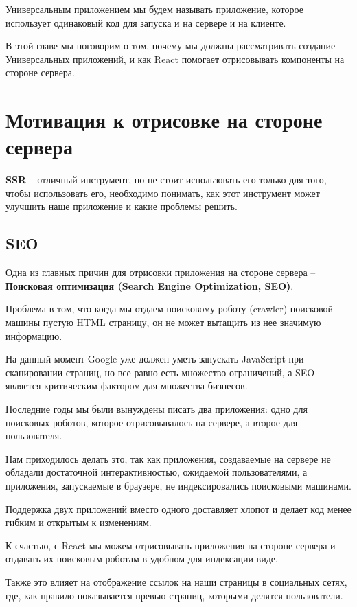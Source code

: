 Универсальным приложением мы будем называть приложение, которое использует одинаковый код для запуска и на сервере и на клиенте.

В этой главе мы поговорим о том, почему мы должны рассматривать создание Универсальных приложений, и как React помогает отрисовывать компоненты на стороне сервера.


\section{Мотивация к отрисовке на стороне сервера}

\textbf{SSR} -- отличный инструмент, но не стоит использовать его только для того, чтобы использовать его, необходимо понимать, как этот инструмент может улучшить наше приложение и какие проблемы решить.

\subsection{SEO}

Одна из главных причин для отрисовки приложения на стороне сервера -- \textbf{Поисковая оптимизация (Search Engine Optimization, SEO)}.

Проблема в том, что когда мы отдаем поисковому роботу (crawler) поисковой машины пустую HTML страницу, он не может вытащить из нее значимую информацию. 

На данный момент Google уже должен уметь запускать JavaScript при сканировании страниц, но все равно есть множество ограничений, а SEO является критическим фактором для множества бизнесов.

Последние годы мы были вынуждены писать два приложения: одно для поисковых роботов, которое отрисовывалось на сервере, а второе для пользователя.

Нам приходилось делать это, так как приложения, создаваемые на сервере не обладали достаточной интерактивностью, ожидаемой пользователями, а приложения, запускаемые в браузере, не индексировались поисковыми машинами.

Поддержка двух приложений вместо одного доставляет хлопот и делает код менее гибким и открытым к изменениям.

К счастью, с React мы можем отрисовывать приложения на стороне сервера и отдавать их поисковым роботам в удобном для индексации виде.

Также это влияет на отображение ссылок на наши страницы в социальных сетях, где, как правило показывается превью страниц, которыми делятся пользователи.

